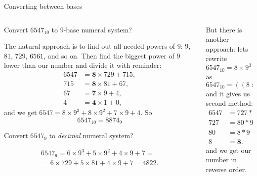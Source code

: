 \documentclass[9pt,aspectratio=169]{beamer}
\begin{document}
\begin{frame}{Converting between bases}
  \begin{columns}[T]
    \begin{column}{0.5\textwidth}
      \begin{problem}
        Convert $6547_{10}$ to $9$-base numeral system?
      \end{problem}

      The natural approach is to find out all needed powers of $9$: 
      $9$, $81$, $729$, $6561$, and so on. Then find the biggest power of $9$ lower than our number and divide it with reminder:
      \begin{align*}
        6547 &= \mathbf{8} \times 729 + 715, \\
        715 &= \mathbf{8} \times 81 + 67, \\
        67 &= \mathbf{7} \times 9 + 4, \\
        4 &= \mathbf{4} \times 1 + 0,
      \end{align*}
      and we get 
      $ 6547 = 8 \times 9^3 + 8 \times 9^2 + 7 \times 9 + 4. $
      So \[6547_{10} = 8874_{9}\] \vspace*{-0.8\baselineskip}
      \begin{problem}
        Convert $6547_{9}$ to \emph{decimal} numeral system?
      \end{problem} \vspace*{-1\baselineskip}
      \begin{multline*}
         6547_{9} = 6 \times 9^3 + 5 \times 9^2 + 4 \times 9 + 7 = \\
         = 6 \times 729 + 5 \times 81 + 4 \times 9 + 7 = 4822. 
      \end{multline*}
    \end{column}
    \begin{column}{0.5\textwidth}
      But there is another approach:
      lets rewrite
      \[ 6547_{10} = 8 \times 9^3 + 8 \times 9^2 + 7 \times 9 + 4. \]
      as
      \[ 6547_{10} = \left( \left(8 \times 9 + 8 \right) \times 9 + 7 \right) \times 9 + 4. \]
      and it gives us second method:
      \begin{align*}
        6547 &= 727 * 9 + \mathbf{4}, \\
        727 &= 80 * 9 + \mathbf{7}, \\
        80 &= 8 * 9 + \mathbf{8}, \\
        8 &= \mathbf{8}.         
      \end{align*}
      and we get our number in reverse order. 
      

\end{column}
\end{columns}
\end{frame}
\end{document}
